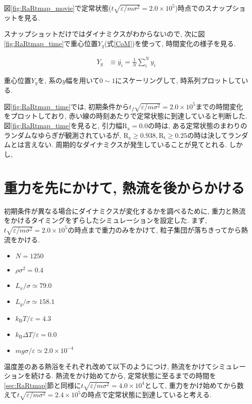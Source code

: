 図\ref{fig:RaRtmap_movie}で定常状態($t\sqrt{\varepsilon / m \sigma^2} = 2.0 \times 10^{5}$)時点でのスナップショットを見る.



スナップショットだけではダイナミクスがわからないので, 次に図\ref{fig:RaRtmap_time}で重心位置$Y_g$(式\eqref{CoM})を使って, 時間変化の様子を見る. 

\begin{align}
  \label{CoM}
  Y_g &\equiv \bar{y_i} = \frac{1}{N} \sum_{i}^{N} y_i
\end{align}

重心位置$Y_g$を, 系の$y$幅を用いて$0\sim 1$にスケーリングして, 時系列プロットしている.



図\ref{fig:RaRtmap_time}では, 初期条件から$t_f \sqrt{\varepsilon / m \sigma^2} = 2.0 \times 10^{5}$までの時間変化をプロットしており, 赤い線の時刻あたりで定常状態に到達していると判断した. 図\ref{fig:RaRtmap_time}を見ると, 引力幅$\text{R}_\text{a}=0.0$の時は, ある定常状態のまわりのランダムなゆらぎが観測されているが, $\text{R}_\text{a} \ge 0.938, \text{R}_\text{t} \ge 0.25$の時は決してランダムとは言えない. 周期的なダイナミクスが発生していることが見てとれる. しかし, 

\section{重力を先にかけて, 熱流を後からかける}

初期条件が異なる場合にダイナミクスが変化するかを調べるために, 重力と熱流をかけるタイミングをずらしたシミュレーションを設定した. まず, $t \sqrt{\varepsilon / m \sigma^2} = 2.0 \times 10^{5}$の時点まで重力のみをかけて, 粒子集団が落ちきってから熱流をかける. 

\begin{itemize}
  \item $N = 1250$
  \item $\rho \sigma^2 = 0.4$
  \item $L_x / \sigma \simeq 79.0$
  \item $L_y / \sigma \simeq 158.1$
  \item $k_{\text{B}} T/\varepsilon = 4.3$
  \item $k_{\text{B}} \Delta T/\varepsilon = 0.0$
  \item $mg\sigma/\varepsilon \simeq 2.0 \times 10^{-4}$
\end{itemize}

温度差のある熱浴をそれぞれ改めて以下のようにつけ, 熱流をかけてシミュレーションを続ける. 熱流をかけ始めてから, 定常状態に至るまでの時間を\ref{sec:RaRtmap}節と同様に$t \sqrt{\varepsilon / m \sigma^2} = 4.0 \times 10^{4}$として, 重力をかけ始めてから数えて$t \sqrt{\varepsilon / m \sigma^2} = 2.4 \times 10^{5}$の時点で定常状態に到達していると考える. 

